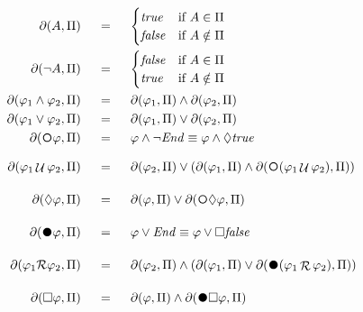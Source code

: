 \begin{align}
\begin{aligned}
\Dfun{A} 			\ind &= \ind 
\begin{cases}
\true 	& \text{if}\ A \in \PropInt\\
\false  & \text{if}\ A \notin \PropInt\\
\end{cases}\\
\Dfun{\lnot A} 			\ind &= \ind 
\begin{cases}
\false 	& \text{if}\ A \in \PropInt\\
\true   & \text{if}\ A \notin \PropInt\\
\end{cases}\\
\Dfun{\varphi_1 \lAND \varphi_2} 			\ind &= \ind   \Dfun{\varphi_1} \lAND \Dfun{\varphi_2}\\
\Dfun{\varphi_1 \lOR  \varphi_2} 			\ind &= \ind   \Dfun{\varphi_1} \lOR \Dfun{\varphi_2}\\
\Dfun{\Next \varphi} 	\ind &= \ind   \varphi \lAND \lnot \Ended \equiv \varphi \lAND \Diamond \true\\
\Dfun{\varphi_1 \lUntil \varphi_2} 	\ind &= \ind   \Dfun{\varphi_2} \lOR (\Dfun{\varphi_1} \lAND\Dfun{\Next(\varphi_1 \lUntil \varphi_2)})\\
\Dfun{\Diamond \varphi} 	\ind &= \ind   \Dfun{\varphi} \lOR \Dfun{\Next \Diamond \varphi}\\
\Dfun{\Wnext \varphi} 	\ind &= \ind   \varphi \lOR \Ended \equiv \varphi \lOR \Box \false\\
\Dfun{\varphi_1 \R \varphi_2} 	\ind &= \ind   \Dfun{\varphi_2} \lAND (\Dfun{\varphi_1} \lOR \Dfun{\Wnext(\varphi_1 \Release \varphi_2)})\\
\Dfun{\Box \varphi} 	\ind &= \ind   \Dfun{\varphi} \lAND \Dfun{\Wnext \Box \varphi}\label{delta-ltlf}
\end{aligned}		
\end{align}
